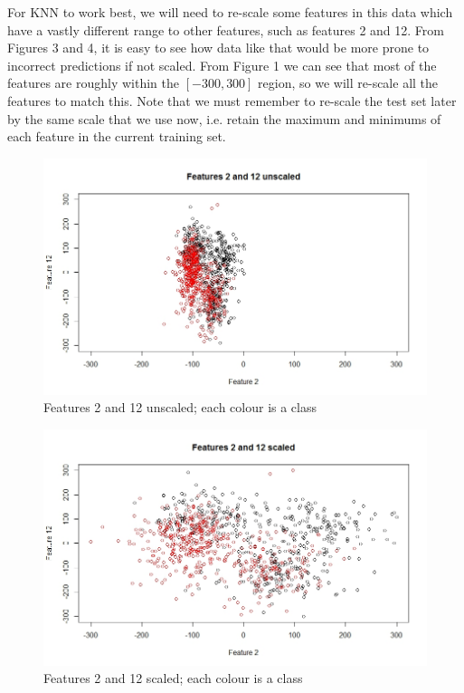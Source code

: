 \documentclass[11pt, a4paper]{article}
\begin{document}
For KNN to work best, we will need to re-scale some features in this data which have a vastly different range to other features, such as features 2 and 12. From Figures 3 and 4, it is easy to see how data like that would be more prone to incorrect predictions if not scaled. From Figure 1 we can see that most of the features are roughly within the $[-300,300]$ region, so we will re-scale all the features to match this. Note that we must remember to re-scale the test set later by the same scale that we use now, i.e. retain the maximum and minimums of each feature in the current training set.

\begin{figure}[H]
\centering
	\includegraphics[scale=0.4]{f212.jpeg}
\caption{Features 2 and 12 unscaled; each colour is a class}
\end{figure}

\begin{figure}[H]
\centering
	\includegraphics[scale=0.4]{f2122.jpeg}
\caption{Features 2 and 12 scaled; each colour is a class}
\end{figure}
\end{document}
